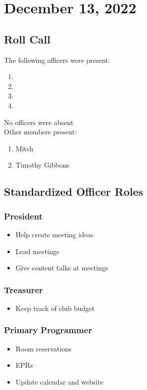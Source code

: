 \section{December 13, 2022}

\subsection{Roll Call}

The following officers were present:

\begin{enumerate}
    \item \president
    \item \tresurer
    \item \primaryprogrammer
    \item \secretary
\end{enumerate}

No officers were absent
\\
Other members present:
\begin{enumerate}
    \item Mitch
    \item Timothy Gibbons
\end{enumerate}

\subsection{Standardized Officer Roles}
    \subsubsection{President}
        \begin{itemize}
            \item Help create meeting ideas
            \item Lead meetings
            \item Give content talks at meetings
        \end{itemize}
    \subsubsection{Treasurer}
        \begin{itemize}
            \item Keep track of club budget
        \end{itemize}
    \subsubsection{Primary Programmer}
        \begin{itemize}
            \item Room reservations
            \item EPRs
            \item Update calendar and website
        \end{itemize}
